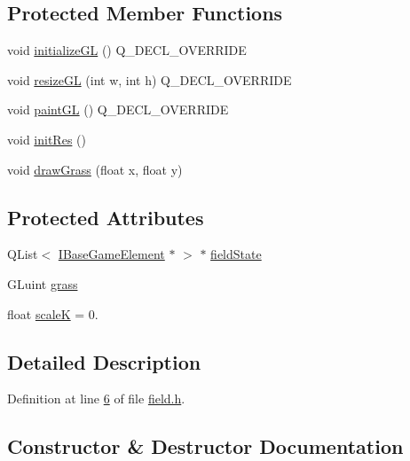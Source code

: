\subsection*{Protected Member Functions}
\begin{DoxyCompactItemize}
\item 
void \hyperlink{a00173_a38484502a93b5cd191d8ababc415e0cb}{initialize\+GL} () Q\+\_\+\+D\+E\+C\+L\+\_\+\+O\+V\+E\+R\+R\+I\+DE
\item 
void \hyperlink{a00173_a4122f1e70a73ec6c580029d968e4553c}{resize\+GL} (int w, int h) Q\+\_\+\+D\+E\+C\+L\+\_\+\+O\+V\+E\+R\+R\+I\+DE
\item 
void \hyperlink{a00173_a43d725e582133d23bcbebdcd7bd4a287}{paint\+GL} () Q\+\_\+\+D\+E\+C\+L\+\_\+\+O\+V\+E\+R\+R\+I\+DE
\item 
void \hyperlink{a00173_ac2d8f10e9bccfe3cf51cf534c73cecd4}{init\+Res} ()
\item 
void \hyperlink{a00173_a05becf8069f37b0529b691fcdd1ca8f1}{draw\+Grass} (float x, float y)
\end{DoxyCompactItemize}
\subsection*{Protected Attributes}
\begin{DoxyCompactItemize}
\item 
Q\+List$<$ \hyperlink{a00137}{I\+Base\+Game\+Element} $\ast$ $>$ $\ast$ \hyperlink{a00173_a7cd047782edbf1436174dfc2aeea1bdc}{field\+State}
\item 
G\+Luint \hyperlink{a00173_a4b226d02ce54a5d320cf3dc99b7b8433}{grass}
\item 
float \hyperlink{a00173_af59e50c5d976daa2af7f35f1f3ea2b7c}{scaleK} = 0.
\end{DoxyCompactItemize}


\subsection{Detailed Description}


Definition at line \hyperlink{a00074_source_l00006}{6} of file \hyperlink{a00074_source}{field.\+h}.



\subsection{Constructor \& Destructor Documentation}
\mbox{\label{a00173_ab3e028578ffc9df6d7d12dbbc83be19f}} 
